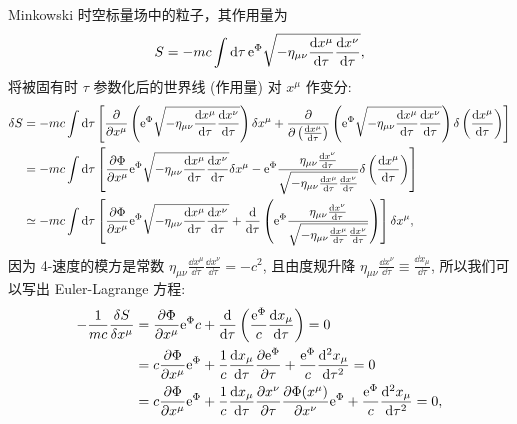 \begin{solution}
    Minkowski 时空标量场中的粒子，其作用量为
    \[
        S = - m c \int \dd \tau \,\mathrm e^{\Phi} \sqrt{- \eta_{\mu \nu} \frac{\dd x^\mu}{\dd \tau} \frac{\dd x^\nu}{\dd \tau}},
    \]
    将被固有时 $\tau$ 参数化后的世界线 (作用量) 对 $x^\mu$ 作变分:
    \begin{align*}
        \delta S &= - mc \int \dd \tau \left[\frac{\partial}{\partial x^\mu} \left(\mathrm e^{\Phi} \sqrt{- \eta_{\mu \nu} \frac{\dd x^\mu}{\dd \tau} \frac{\dd x^\nu}{\dd \tau}}\right) \delta x^\mu + \frac{\partial}{\partial \left(\frac{\dd x^\mu}{\dd \tau}\right)} \left(\mathrm e^{\Phi} \sqrt{- \eta_{\mu \nu} \frac{\dd x^\mu}{\dd \tau} \frac{\dd x^\nu}{\dd \tau}}\right)\delta \left(\frac{\dd x^\mu}{\dd \tau}\right)\right]  \\
        &= - mc \int \dd \tau \left[\frac{\partial \Phi}{\partial x^\mu} \mathrm e^{\Phi} \sqrt{- \eta_{\mu \nu} \frac{\dd x^\mu}{\dd \tau} \frac{\dd x^\nu}{\dd \tau}} \delta x^\mu - \mathrm e^{\Phi} \frac{\eta_{\mu \nu} \frac{\dd x^\nu}{\dd \tau}}{\sqrt{- \eta_{\mu \nu} \frac{\dd x^\mu}{\dd \tau} \frac{\dd x^\nu}{\dd \tau}}} \delta \left(\frac{\dd x^\mu}{\dd \tau}\right)\right] \\
        & \simeq -mc \int \dd \tau \left[\frac{\partial \Phi}{\partial x^\mu} \mathrm e^{\Phi} \sqrt{- \eta_{\mu \nu} \frac{\dd x^\mu}{\dd \tau} \frac{\dd x^\nu}{\dd \tau}} + \frac{\dd}{\dd \tau} \left(\mathrm e^{\Phi} \frac{\eta_{\mu \nu} \frac{\dd x^\nu}{\dd \tau}}{\sqrt{- \eta_{\mu \nu} \frac{\dd x^\mu}{\dd \tau} \frac{\dd x^\nu}{\dd \tau}}}\right) \right] \delta x^\mu,
    \end{align*}
    因为 4-速度的模方是常数 $\eta_{\mu \nu} \frac{\dd x^\mu}{\dd \tau} \frac{\dd x^\nu}{\dd \tau} = - c^2$, 且由度规升降 $\eta_{\mu \nu} \frac{\dd x^\nu}{\dd \tau} \equiv \frac{\dd x_\mu}{\dd \tau}$, 所以我们可以写出 Euler-Lagrange 方程:
    \begin{align*}
        - \frac{1}{mc} \frac{\delta S}{\delta x^\mu} &= \frac{\pp \Phi}{\pp x^\mu} \me^\Phi c + \frac{\dd}{\dd \tau} \left(\frac{\me^\Phi}{c} \frac{\dd x_\mu}{\dd \tau}\right) = 0 \\
        &= c \frac{\pp \Phi}{\pp x^\mu} \me^\Phi + \frac{1}{c} \frac{\dd x_\mu}{\dd \tau} \frac{\pp \me^\Phi}{\pp \tau} + \frac{\me^\Phi}{c} \frac{\dd^2 x_\mu}{\dd \tau^2} = 0 \\
        &= c \frac{\pp \Phi}{\pp x^\mu} \me^\Phi + \frac{1}{c} \frac{\dd x_\mu}{\dd \tau} \frac{\pp x^\nu}{\pp \tau} \frac{\pp \Phi (x^\mu)}{\pp x^\nu} \me^\Phi + \frac{\me^\Phi}{c} \frac{\dd^2 x_\mu}{\dd \tau^2} = 0,

\end{align*}
\end{solution}
